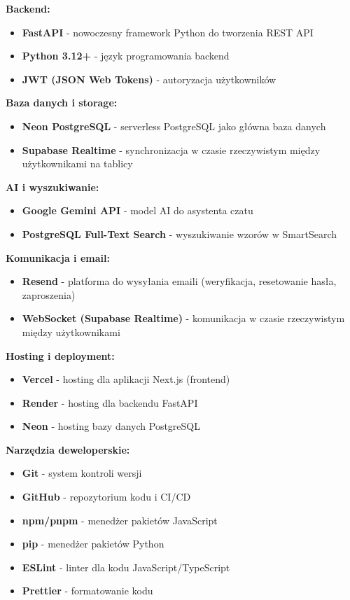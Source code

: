 \documentclass[12pt,a4paper]{article}
\begin{document}
\textbf{Backend:}
\begin{itemize}[leftmargin=*]
    \item \textbf{FastAPI} - nowoczesny framework Python do tworzenia REST API
    \item \textbf{Python 3.12+} - język programowania backend
    
    \item \textbf{JWT (JSON Web Tokens)} - autoryzacja użytkowników
\end{itemize}

\textbf{Baza danych i storage:}
\begin{itemize}[leftmargin=*]
    \item \textbf{Neon PostgreSQL} - serverless PostgreSQL jako główna baza danych
    \item \textbf{Supabase Realtime} - synchronizacja w czasie rzeczywistym między użytkownikami na tablicy
    
\end{itemize}

\textbf{AI i wyszukiwanie:}
\begin{itemize}[leftmargin=*]
    \item \textbf{Google Gemini API} - model AI do asystenta czatu
    \item \textbf{PostgreSQL Full-Text Search} - wyszukiwanie wzorów w SmartSearch
\end{itemize}

\textbf{Komunikacja i email:}
\begin{itemize}[leftmargin=*]
    \item \textbf{Resend} - platforma do wysyłania emaili (weryfikacja, resetowanie hasła, zaproszenia)
    \item \textbf{WebSocket (Supabase Realtime)} - komunikacja w czasie rzeczywistym między użytkownikami
\end{itemize}

\textbf{Hosting i deployment:}
\begin{itemize}[leftmargin=*]
    \item \textbf{Vercel} - hosting dla aplikacji Next.js (frontend)
    \item \textbf{Render} - hosting dla backendu FastAPI
    \item \textbf{Neon} - hosting bazy danych PostgreSQL
\end{itemize}

\textbf{Narzędzia deweloperskie:}
\begin{itemize}[leftmargin=*]
    \item \textbf{Git} - system kontroli wersji
    \item \textbf{GitHub} - repozytorium kodu i CI/CD
    \item \textbf{npm/pnpm} - menedżer pakietów JavaScript
    \item \textbf{pip} - menedżer pakietów Python
    \item \textbf{ESLint} - linter dla kodu JavaScript/TypeScript
    \item \textbf{Prettier} - formatowanie kodu
\end{itemize}
\end{document}
